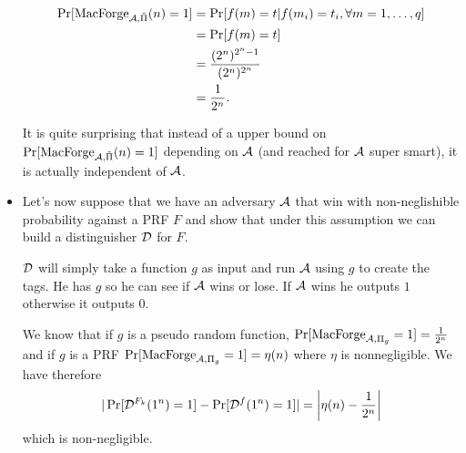 \begin{solution}
\begin{itemize}
      \begin{align*}
        \Pr[\operatorname{MacForge}_{\mathcal{A}, \tilde{\Pi}}(n) = 1]
        & = \Pr[f(m) = t | f(m_i) = t_i, \forall m = 1, \ldots, q]\\
        & = \Pr[f(m) = t]\\
        & = \frac{(2^n)^{2^n-1}}{(2^n)^{2^n}}\\
        & = \frac{1}{2^n}.
      \end{align*}

      It is quite surprising that instead of a upper bound
      on $\Pr[\operatorname{MacForge}_{\mathcal{A}, \tilde{\Pi}}(n) = 1]$
      depending on $\mathcal{A}$ (and reached for $\mathcal{A}$ super smart),
      it is actually independent of $\mathcal{A}$.
    \item
      Let's now suppose that we have an adversary $\mathcal{A}$
      that win with non-neglishible probability against a PRF $F$
      and show that under this assumption we can build
      a distinguisher $\mathcal{D}$ for $F$.

      $\mathcal{D}$ will simply take a function $g$ as input
      and run $\mathcal{A}$ using $g$ to create the tags.
      He has $g$ so he can see if $\mathcal{A}$ wins or lose.
      If $\mathcal{A}$ wins he outputs $1$ otherwise it outputs $0$.

      We know that if $g$ is a pseudo random function,
      $\Pr[\operatorname{MacForge}_{\mathcal{A}, \Pi_g} = 1] = \frac{1}{2^n}$
      and if $g$ is a PRF
      $\Pr[\operatorname{MacForge}_{\mathcal{A}, \Pi_g} = 1] = \eta(n)$
      where $\eta$ is nonnegligible.
      We have therefore
      \[
        |\Pr[\mathcal{D}^{F_k}(1^n) = 1] - \Pr[\mathcal{D}^{f}(1^n) = 1]|
        = \left|\eta(n) - \frac{1}{2^n}\right|
      \]
      which is non-negligible.

  \end{itemize}

\end{solution}

